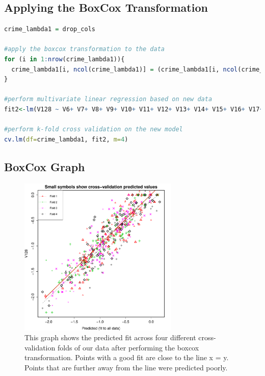 \documentclass{article}
\begin{document}
\subsection{Applying the BoxCox Transformation}
\begin{lstlisting}[language=r]
crime_lambda1 = drop_cols

#apply the boxcox transformation to the data
for (i in 1:nrow(crime_lambda1)){
  crime_lambda1[i, ncol(crime_lambda1)] = (crime_lambda1[i, ncol(crime_lambda1)]^0.3-1)/0.3
}

#perform multivariate linear regression based on new data
fit2<-lm(V128 ~ V6+ V7+ V8+ V9+ V10+ V11+ V12+ V13+ V14+ V15+ V16+ V17+ V18+ V19+ V20+ V21+ V22+ V23+ V24+ V25+ V26+ V27+ V28+ V29+ V30+ V32+ V33+ V34+ V35+ V36+ V37+ V38+ V39+ V40+ V41+ V42+ V43+ V44+ V45+ V46+ V47+ V48+ V49+ V50+ V51+ V52+ V53+ V54+ V55+ V56+ V57+ V58+ V59+ V60+ V61+ V62+ V63+ V64+ V65+ V66+ V67+ V68+ V69+ V70+ V71+ V72+ V73+ V74+ V75+ V76+ V77+ V78+ V79+ V80+ V81+ V82+ V83+ V84+ V85+ V86+ V87+ V88+ V89+ V90+ V91+ V92+ V93+ V94+ V95+ V96+ V97+ V98+ V99+ V100+ V101+ V119+ V120+ V121+ V126, data=crime_lambda1)

#perform k-fold cross validation on the new model
cv.lm(df=crime_lambda1, fit2, m=4)
\end{lstlisting}

\subsection{BoxCox Graph}
\begin{figure}[H]
\centering
\includegraphics[width=3.0in]{part1b.pdf}
\caption{This graph shows the predicted fit across four different cross-validation folds of our data after performing the boxcox transformation. Points with a good fit are close to the line x = y. Points that are further away from the line were predicted poorly.}\label{fig_container} 
\end{figure}
\end{document}

